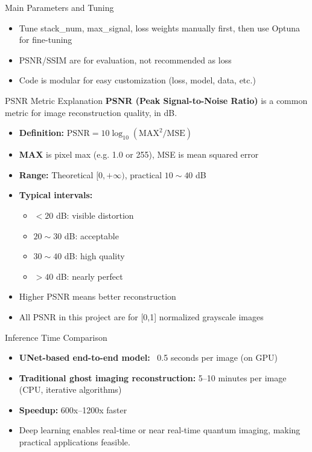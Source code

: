 \documentclass{beamer}
\begin{document}
\begin{frame}{Main Parameters and Tuning}
\begin{itemize}
    \item Tune stack_num, max_signal, loss weights manually first, then use Optuna for fine-tuning
    \item PSNR/SSIM are for evaluation, not recommended as loss
    \item Code is modular for easy customization (loss, model, data, etc.)
\end{itemize}
\end{frame}

\begin{frame}{PSNR Metric Explanation}
    \textbf{PSNR (Peak Signal-to-Noise Ratio)} is a common metric for image reconstruction quality, in dB.
    \begin{itemize}
        \item \textbf{Definition:} $\mathrm{PSNR} = 10 \log_{10}(\mathrm{MAX}^2 / \mathrm{MSE})$
        \item \textbf{MAX} is pixel max (e.g. 1.0 or 255), MSE is mean squared error
        \item \textbf{Range:} Theoretical $[0, +\infty)$, practical $10\sim40$ dB
        \item \textbf{Typical intervals:}
        \begin{itemize}
            \item $<20$ dB: visible distortion
            \item $20\sim30$ dB: acceptable
            \item $30\sim40$ dB: high quality
            \item $>40$ dB: nearly perfect
        \end{itemize}
        \item Higher PSNR means better reconstruction
        \item All PSNR in this project are for [0,1] normalized grayscale images
    \end{itemize}
\end{frame}

\begin{frame}{Inference Time Comparison}
\begin{itemize}
    \item \textbf{UNet-based end-to-end model:} ~0.5 seconds per image (on GPU)
    \item \textbf{Traditional ghost imaging reconstruction:} 5--10 minutes per image (CPU, iterative algorithms)
    \item \textbf{Speedup:} 600x--1200x faster
    \item Deep learning enables real-time or near real-time quantum imaging, making practical applications feasible.
\end{itemize}
\end{frame}
\end{document}
